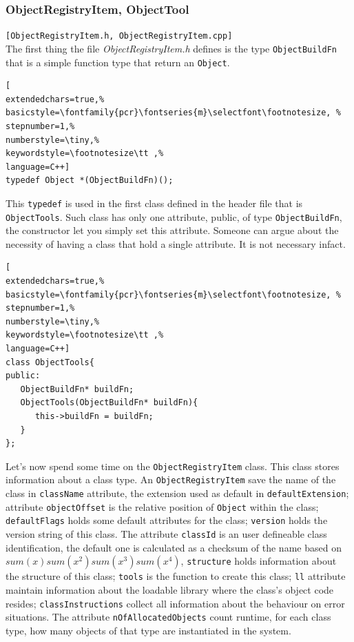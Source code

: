 \subsubsection{ObjectRegistryItem, ObjectTool}
\texttt{[ObjectRegistryItem.h, ObjectRegistryItem.cpp]}\\

The first thing the file \textit{ObjectRegistryItem.h} defines is the type \texttt{ObjectBuildFn} that is a simple function type that return an \texttt{Object}.

\begin{lstlisting}[
extendedchars=true,%
basicstyle=\fontfamily{pcr}\fontseries{m}\selectfont\footnotesize, %
stepnumber=1,%
numberstyle=\tiny,%
keywordstyle=\footnotesize\tt ,%
language=C++]
typedef Object *(ObjectBuildFn)();
\end{lstlisting}

This \texttt{typedef} is used in the first class defined in the header file that is \texttt{ObjectTools}. Such class has only one attribute, public, of type \texttt{ObjectBuildFn}, the constructor let you simply set this attribute. Someone can argue about the necessity of having a class that hold a single attribute. It is not necessary infact.

\begin{lstlisting}[
extendedchars=true,%
basicstyle=\fontfamily{pcr}\fontseries{m}\selectfont\footnotesize, %
stepnumber=1,%
numberstyle=\tiny,%
keywordstyle=\footnotesize\tt ,%
language=C++]
class ObjectTools{
public:
   ObjectBuildFn* buildFn;
   ObjectTools(ObjectBuildFn* buildFn){
      this->buildFn = buildFn;
   }
};
\end{lstlisting}

Let's now spend some time on the \texttt{ObjectRegistryItem} class. This class stores information about a class type.
An \texttt{ObjectRegistryItem} save the name of the class in \texttt{className} attribute, the extension used as default in \texttt{defaultExtension}; attribute \texttt{objectOffset} is the relative position of \texttt{Object} within the class; \texttt{defaultFlags} holds some default attributes for the class; \texttt{version} holds the version string of this class.
The attribute \texttt{classId} is an user defineable class identification, the default one is calculated as a checksum of the name based on $sum(x) sum(x^2) sum(x^3) sum(x^4)$, \texttt{structure} holds information about the structure of this class; \texttt{tools} is the function to create this class; \texttt{ll} attribute maintain information about the loadable library where the class's object code resides; \texttt{classInstructions} collect all information about the behaviour on error situations. The attribute \texttt{nOfAllocatedObjects} count runtime, for each class type, how many objects of that type are instantiated in the system.

